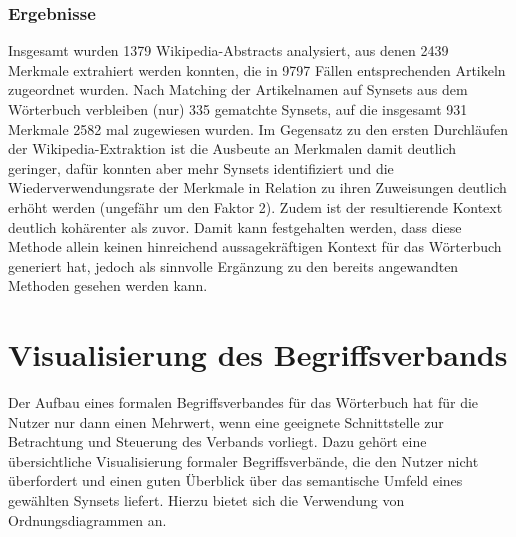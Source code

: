 \documentclass[pagesize,paper=A4,DIV=calc,fontsize=12pt,draft=false]{scrreprt}
\begin{document}
\subsubsection{Ergebnisse}

Insgesamt wurden 1379 Wikipedia-Abstracts analysiert, aus denen 2439 Merkmale extrahiert werden konnten, die in 9797 Fällen entsprechenden Artikeln zugeordnet wurden. 
Nach Matching der Artikelnamen auf Synsets aus dem Wörterbuch verbleiben (nur) 335 gematchte Synsets, auf die insgesamt 931 Merkmale 2582 mal zugewiesen wurden. 
Im Gegensatz zu den ersten Durchläufen der Wikipedia-Extraktion ist die Ausbeute an Merkmalen damit deutlich geringer, dafür konnten aber mehr Synsets identifiziert und die Wiederverwendungsrate der Merkmale in Relation zu ihren Zuweisungen deutlich erhöht werden (ungefähr um den Faktor 2). 
Zudem ist der resultierende Kontext deutlich kohärenter als zuvor. 
Damit kann festgehalten werden, dass diese Methode allein keinen hinreichend aussagekräftigen Kontext für das Wörterbuch generiert hat, jedoch als sinnvolle Ergänzung zu den bereits angewandten Methoden gesehen werden kann. 

\section{Visualisierung des Begriffsverbands}

Der Aufbau eines formalen Begriffsverbandes für das Wörterbuch hat für die Nutzer nur dann einen Mehrwert, wenn eine geeignete Schnittstelle zur Betrachtung und Steuerung des Verbands vorliegt. 
Dazu gehört eine übersichtliche Visualisierung formaler Begriffsverbände, die den Nutzer nicht überfordert und einen guten Überblick über das semantische Umfeld eines gewählten Synsets liefert.
Hierzu bietet sich die Verwendung von Ordnungsdiagrammen an. 
\end{document}
